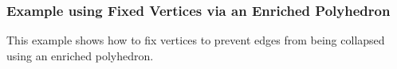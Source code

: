 \subsubsection{Example using Fixed Vertices via an Enriched Polyhedron}

This example shows how to fix vertices to prevent edges from being collapsed using an enriched polyhedron.




